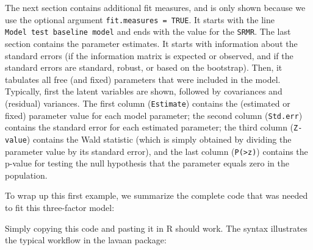 The next section contains additional fit measures, and is only shown
because we use the optional argument \texttt{fit.measures\ =\ TRUE}. It
starts with the line \texttt{Model\ test\ baseline\ model} and ends with
the value for the \texttt{SRMR}. The last section contains the parameter
estimates. It starts with information about the standard errors (if the
information matrix is expected or observed, and if the standard errors
are standard, robust, or based on the bootstrap). Then, it tabulates all
free (and fixed) parameters that were included in the model. Typically,
first the latent variables are shown, followed by covariances and
(residual) variances. The first column (\texttt{Estimate}) contains the
(estimated or fixed) parameter value for each model parameter; the
second column (\texttt{Std.err}) contains the standard error for each
estimated parameter; the third column (\texttt{Z-value}) contains the
Wald statistic (which is simply obtained by dividing the parameter value
by its standard error), and the last column
(\texttt{P(\textgreater{}\textbar{}z\textbar{})}) contains the p-value
for testing the null hypothesis that the parameter equals zero in the
population.

To wrap up this first example, we summarize the complete code that was
needed to fit this three-factor model:

\begin{Shaded}
\begin{Highlighting}[]


\StringTok{ }

\NormalTok{)}
\end{Highlighting}
\end{Shaded}

Simply copying this code and pasting it in R should work. The syntax
illustrates the typical workflow in the lavaan package:

